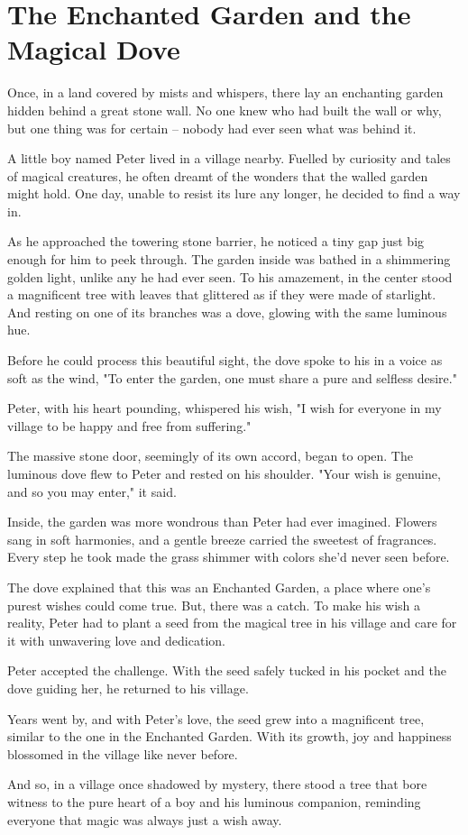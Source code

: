 \documentclass{article}
\begin{document}
\section{The Enchanted Garden and the Magical Dove}

Once, in a land covered by mists and whispers, there lay an enchanting garden hidden behind a great stone wall. No one knew who had built the wall or why, but one thing was for certain – nobody had ever seen what was behind it.

A little boy named Peter lived in a village nearby. Fuelled by curiosity and tales of magical creatures, he often dreamt of the wonders that the walled garden might hold. One day, unable to resist its lure any longer, he decided to find a way in.

As he approached the towering stone barrier, he noticed a tiny gap just big enough for him to peek through. The garden inside was bathed in a shimmering golden light, unlike any he had ever seen. To his amazement, in the center stood a magnificent tree with leaves that glittered as if they were made of starlight. And resting on one of its branches was a dove, glowing with the same luminous hue.

Before he could process this beautiful sight, the dove spoke to his in a voice as soft as the wind, "To enter the garden, one must share a pure and selfless desire."

Peter, with his heart pounding, whispered his wish, "I wish for everyone in my village to be happy and free from suffering."

The massive stone door, seemingly of its own accord, began to open. The luminous dove flew to Peter and rested on his shoulder. "Your wish is genuine, and so you may enter," it said.

Inside, the garden was more wondrous than Peter had ever imagined. Flowers sang in soft harmonies, and a gentle breeze carried the sweetest of fragrances. Every step he took made the grass shimmer with colors she'd never seen before.

The dove explained that this was an Enchanted Garden, a place where one’s purest wishes could come true. But, there was a catch. To make his wish a reality, Peter had to plant a seed from the magical tree in his village and care for it with unwavering love and dedication.

Peter accepted the challenge. With the seed safely tucked in his pocket and the dove guiding her, he returned to his village.

Years went by, and with Peter's love, the seed grew into a magnificent tree, similar to the one in the Enchanted Garden. With its growth, joy and happiness blossomed in the village like never before.

And so, in a village once shadowed by mystery, there stood a tree that bore witness to the pure heart of a boy and his luminous companion, reminding everyone that magic was always just a wish away.
\end{document}
